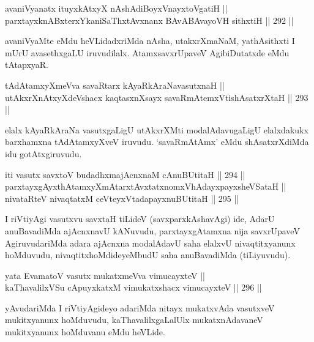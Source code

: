 \begin{shl}
avaniVyanatx ituyxkAtxyX nAshAdiBoyxV\s nayxtoVgatiH || \\
parxtayxknABxterxYkaniSaThxtAvxnanx BAvABAvayoVH sithxtiH \hfill || 292 ||  
\end{shl}

\begin{artha}
avaniVyaMte eMdu heVLidadxriMda nAsha, utakxrXmaNaM, yathAsithxti I mUrU avasethxgaLU iruvudilalx. AtamxsavxrUpaveV AgibiDutatxde eMdu tAtapxyaR.
\end{artha}

\begin{shl}
tAdAtamxyXmeVva savaRtarx kAyaRkAraNavasutxnaH || \\
utAkxrXnAtxyXdeVshacx kaqtasxnXsayx savaRmAtemxVtishAsatxrXtaH \hfill || 293 ||  
\end{shl}

\begin{artha}
elalx kAyaRkAraNa vasutxgaLigU utAkxrXMti modalAdavugaLigU elalxdakukx
barxhamxna tAdAtamxyXveV iruvudu. `savaRmAtAmx' eMdu shAsatxrXdiMda idu gotAtxgiruvudu.
\end{artha}

\begin{shl}
iti vasutx savxtoV budadhxmajAcnxnaM cAnuBUtitaH \hfill || 294 ||  \\
parxtayxgAyxthAtamxyXmAtarxtAvxtatxnomxVhAdayxpayxsheVSataH || \\
nivataRteV nivaqtatxM ceVteyxVtadapayxnuBUtitaH \hfill || 295 ||  
\end{shl}

\begin{artha}
I riVtiyAgi vasutxvu savxtaH tiLideV (savxparxkAshavAgi) ide, AdarU
anuBavadiMda ajAcnxnavU kANuvudu, parxtayxgAtamxna nija savxrUpaveV
AgiruvudariMda adara ajAcnxna modalAdavU saha elalxvU nivaqtitxyanunx
hoMduvudu, nivaqtitxhoMdideyeMbudU saha anuBavadiMda (tiLiyuvudu).
\end{artha}

\begin{shl}
yata EvamatoV vasutx mukatxmeVva vimucayxteV || \\
kaThavalilxVSu cApuyxkatxM vimukatxshacx vimucayxteV \hfill || 296 ||  
\end{shl}

\begin{artha}
yAvudariMda I riVtiyAgideyo adariMda nitayx mukatxvAda vasutxveV
mukitxyanunx hoMduvudu, kaThavalilxgaLalUlx mukatxnAdavaneV mukitxyanunx hoMduvanu eMdu heVLide.
\end{artha}

